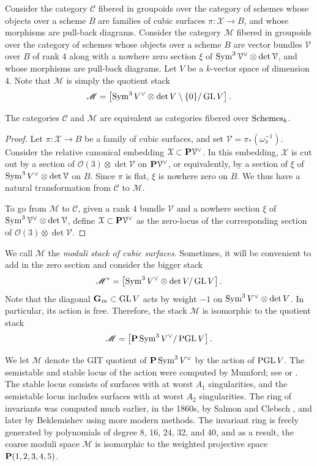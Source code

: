 \documentclass[11pt,reqno, letterpaper]{amsart}
\renewcommand{\k}{k}
\renewcommand{\to}{{\longrightarrow}}
\numberwithin{equation}{section}
\renewcommand{\O}{\mathcal O}
\newcommand{\G}{\mathbf G}
\newcommand{\cX}{\mathcal{X}}
\begin{document}
Consider the category $\mathscr {C}$ fibered in groupoids over the
category of schemes whose objects over a scheme $B$ are families of
cubic surfaces $\pi \colon \cX \to B$, and whose morphisms are pull-back
diagrams.  Consider the category $\mathscr {M}$ fibered in groupoids
over the category of schemes whose objects over a scheme $B$ are
vector bundles $\mathcal V$ over $B$ of rank 4 along with a nowhere
zero section $\xi$ of
$\Sym^3 \mathcal V^\vee \otimes \det \mathcal V$, and whose morphisms
are pull-back diagrams.  Let $V$ be a $\k$-vector space of dimension
4.  Note that $\mathscr{M}$ is simply the quotient stack
\[\mathscr{M} = \left[\Sym^3 V^\vee \otimes \det V \setminus \{0\} / \GL V \right]. \]
\begin{proposition}\label{prop:cubicstack}
  The categories $\mathscr{C}$ and $\mathscr{M}$ are equivalent as categories fibered over ${\rm Schemes}_k$.
\end{proposition}
\begin{proof}
  Let $\pi \colon \cX \to B$ be a family of cubic surfaces, and set
  $\mathcal V = \pi_* \left( \omega_{\pi}^{-1} \right)$.  Consider the
  relative canonical embedding $\cX \subset \P \mathcal V^\vee$.  In
  this embedding, $\cX$ is cut out by a section of
  $\O(3) \otimes \det \mathcal V$ on $\P \mathcal V^\vee$, or
  equivalently, by a section of $\xi$ of
  $\Sym^3V^\vee \otimes \det \mathcal V$ on $B$.  Since $\pi$ is flat,
  $\xi$ is nowhere zero on $B$.  We thus have a natural transformation
  from $\mathscr{C}$ to $\mathscr{M}$.

  To go from $\mathscr{M}$ to $\mathscr{C}$, given a rank 4 bundle $\mathcal V$ and a nowhere section $\xi$ of $\Sym^3 \mathcal V^\vee \otimes \det \mathcal V$, define $\cX \subset \P \mathcal V^\vee$ as the zero-locus of the corresponding section of $\O(3) \otimes \det \mathcal V$.
\end{proof}

We call $\mathscr{M}$ the \emph{moduli stack of cubic surfaces}.
Sometimes, it will be convenient to add in the zero section and consider the bigger stack
\[ \mathscr{M}^* = \left[\Sym^3 V^\vee \otimes \det V / \GL V \right].\]
Note that the diagonal $\G_m \subset \GL V$ acts by weight $-1$ on $\Sym^3 V^\vee \otimes \det V$.
In particular, its action is free.
Therefore, the stack $\mathscr{M}$ is isomorphic to the quotient stack
\[ \mathscr{M} = \left[ \P \Sym^3V^\vee / \PGL V \right].\]

We let $\mathcal M$ denote the GIT quotient of $\P \Sym^3V^\vee$ by
the action of $\PGL V$.  The semistable and stable locus of the
action were computed by Mumford; see \cite[Chapter 4, \S
2]{mum.fog.kir:94} or \cite[1.14]{mum:77}.  The stable locus consists
of surfaces with at worst $A_1$ singularities, and the semistable
locus includes surfaces with at worst $A_2$ singularities.  The ring
of invariants was computed much earlier, in the 1860s, by Salmon
\cite{sal:60} and Clebsch \cite{cle:61,cle:61*1}, and later by
Beklemishev \cite{bek:82} using more modern methods.  The invariant
ring is freely generated by polynomials of degree 8, 16, 24, 32, and
40, and as a result, the coarse moduli space $\mathcal M$ is
isomorphic to the weighted projective space $\P(1,2,3,4,5)$.
\end{document}
